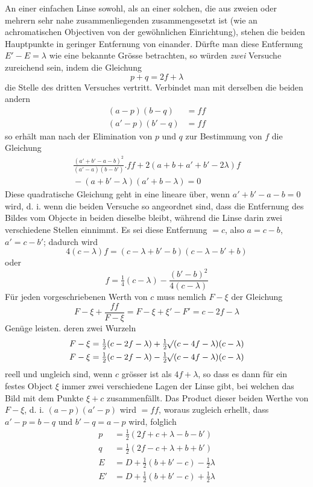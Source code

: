 An einer einfachen Linse sowohl, als an einer solchen, die aus zweien oder mehrern sehr nahe zusammenliegenden zusammengesetzt ist (wie an achromatischen Objectiven von der gewöhnlichen Einrichtung), stehen die beiden Hauptpunkte in geringer Entfernung von einander. Dürfte man diese Entfernung $E'-E=\lambda$ wie eine bekannte Grösse betrachten, so würden \textit{zwei} Versuche zureichend sein, indem die Gleichung
\[
p+q=2f+\lambda
\]
die Stelle des dritten Versuches vertritt. Verbindet man mit derselben die beiden andern
\[
\begin{aligned}
(a-p)(b-q)&=ff\\
(a'-p)(b'-q)&=ff
\end{aligned}
\]
so erhält man nach der Elimination von $p$ und $q$ zur Bestimmung von $f$ die Gleichung
\[
\begin{aligned}
\frac{(a'+b'-a-b)^2}{(a'-a)(b-b')}.ff+2(a+b+a'+b'-2\lambda)f\\
{}-(a+b'-\lambda)(a'+b-\lambda)=0
\end{aligned}
\]
Diese quadratische Gleichung geht in eine lineare über, wenn $a'+b'-a-b=0$ wird, d. i. wenn die beiden Versuche so angeordnet sind, dass die Entfernung des Bildes vom Objecte in beiden dieselbe bleibt, während die Linse darin zwei verschiedene Stellen einnimmt. Es sei diese Entfernung $=c$, also $a=c-b$, $a'=c-b'$; dadurch wird
\[
4(c-\lambda)f=(c-\lambda+b'-b)(c-\lambda-b'+b)
\]
oder
\[
f=\tfrac14(c-\lambda)-\frac{(b'-b)^2}{4(c-\lambda)}
\]
Für jeden vorgeschriebenen Werth von $c$ muss nemlich $F-\xi$ der Gleichung
\[
F-\xi+\frac{ff}{F-\xi}=F-\xi+\xi'-F'=c-2f-\lambda
\]
Genüge leisten. deren zwei Wurzeln
\[
\begin{aligned}
F-\xi&=\tfrac12(c-2f-\lambda)+\tfrac12\mathord{{}^{}\!\surd}(c-4f-\lambda)(c-\lambda)\\
F-\xi&=\tfrac12(c-2f-\lambda)-\tfrac12\mathord{{}^{}\!\surd}(c-4f-\lambda)(c-\lambda)
\end{aligned}
\]
reell und ungleich sind, wenn $c$ grösser ist als $4f+\lambda$, so dass es dann für ein festes Object $\xi$ immer zwei verschiedene Lagen der Linse gibt, bei welchen das Bild mit dem Punkte $\xi+c$ zusammenfällt. Das Product dieser beiden Werthe von $F-\xi$, d. i. $(a-p)(a'-p)$ wird $=ff$, woraus zugleich erhellt,
dass $a'-p=b-q$ und $b'-q=a-p$ wird, folglich
\[
\begin{aligned}
p&=\tfrac12(2f+c+\lambda-b-b')\\
q&=\tfrac12(2f-c+\lambda+b+b')\\
E&=D+\tfrac12(b+b'-c)-\tfrac12\lambda\\
E'&=D+\tfrac12(b+b'-c)+\tfrac12\lambda
\end{aligned}
\]

